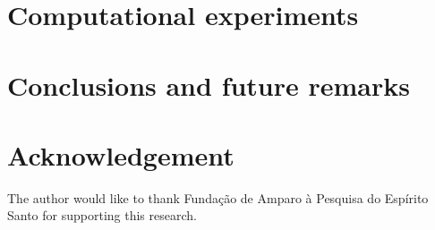 \documentclass[10pt, conference, compsocconf]{IEEEtran}
\begin{document}
\section{Computational experiments}
\label{sec:exp}


\section{Conclusions and future remarks}
\label{sec:conc}


\section{Acknowledgement}
The author would like to thank Funda\c c\~ao de Amparo \`a Pesquisa do
Esp\'irito Santo for supporting this research.


%



\flushend
\end{document}
